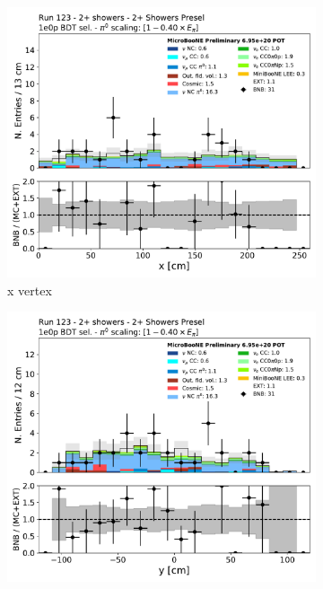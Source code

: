 \begin{figure}[H]
    \centering
    \begin{subfigure}{0.3\textwidth}
    \includegraphics[width=1.0\textwidth]{Sidebands/Figures/TwoShr_1e0pSel/BDT/reco_nu_vtx_x.pdf}
    \caption{x vertex}
    \end{subfigure}
    \begin{subfigure}{0.3\textwidth}
    \includegraphics[width=1.0\textwidth]{Sidebands/Figures/TwoShr_1e0pSel/BDT/reco_nu_vtx_y.pdf}

\end{subfigure}
\end{figure}
